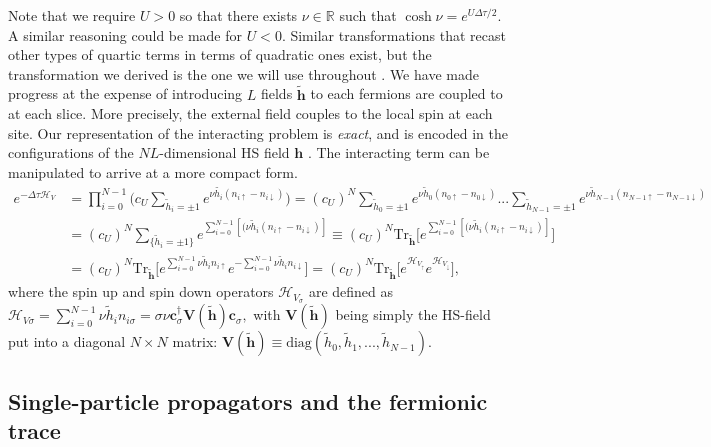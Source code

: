 Note that we require $U > 0$ so that there exists $\nu \in \mathbb{R}$ such that $\cosh \nu = e^{U\Delta \tau / 2}$. A similar reasoning could be made for $U < 0$.
Similar transformations that recast other types of quartic terms in terms of quadratic ones exist, but the transformation we derived is the one we will use throughout \cite{hirsch_monte_1983}.
We have made progress at the expense of introducing $L$ fields $\widetilde{\bm h}$ to each fermions are coupled to at each slice.
More precisely, the external field couples to the local spin at each site.
Our representation of the interacting problem is \emph{exact}, and is encoded in the configurations of the $NL$-dimensional HS field $\bm h$  \cite{hou_numerical_2009}.
The interacting term can be manipulated to arrive at a more compact form.
\begin{equation}\label{eq:exp_quartic}
\begin{split}
e^{-\Delta\tau \mathcal{H}_V} &= \prod_{i=0}^{N-1} \bigg( c_U \sum_{\widetilde{h}_i = \pm 1} e^{\nu \widetilde{h_i} ( n_{i\uparrow} - n_{i\downarrow} )} \bigg) 
=  (c_U)^N \sum_{\widetilde{h}_0 = \pm 1} e^{\nu \widetilde{h}_0 ( n_{0\uparrow} - n_{0\downarrow} )} ... \sum_{\widetilde{h}_{N-1} = \pm 1} e^{\nu \widetilde{h}_{N-1} ( n_{N-1\uparrow} - n_{N-1\downarrow} )} \\
&= (c_U)^N \sum_{ \{ \widetilde{h}_i = \pm 1 \}} e^{\sum_{i=0}^{N-1} [(\nu \widetilde{h}_i ( n_{i\uparrow} - n_{i\downarrow} ) ]} \equiv (c_U)^N \text{Tr}_{\widetilde{\bm h}} \bigg[ e^{\sum_{i=0}^{N-1} [(\nu \widetilde{h}_i ( n_{i\uparrow} - n_{i\downarrow} ) ]} \bigg] \\
&= (c_U)^N \text{Tr}_{\widetilde{\bm h}} \bigg[ e^{\sum_{i=0}^{N-1} \nu \widetilde{h}_i n_{i\uparrow}} e^{-\sum_{i=0}^{N-1} \nu \widetilde{h}_i n_{i\downarrow}} \bigg] = (c_U)^N \text{Tr}_{\widetilde{\bm h}} \bigg[ e^{\mathcal{H}_{V_\uparrow}} e^{\mathcal{H}_{V_\downarrow}} \bigg] ,
\end{split}
\end{equation}
where the spin up and spin down operators $\mathcal{H}_{V_\sigma}$ are defined as 
$
\mathcal{H}_{V\sigma} = \sum_{i=0}^{N-1} \nu \widetilde{h}_i n_{i\sigma} = \sigma \nu \bm c_\sigma^\dagger \bm V(\widetilde{\bm h}) \bm c_\sigma,
$
 with $\bm V(\widetilde{\bm h})$ being simply the HS-field put into a diagonal $N\times N$ matrix: $\bm V(\widetilde{\bm h}) \equiv \text{diag}(\widetilde{h}_0, \widetilde{h}_1, ..., \widetilde{h}_{N-1})$.

\subsection{Single-particle propagators and the fermionic trace}\label{subsec:fermiontrace}


